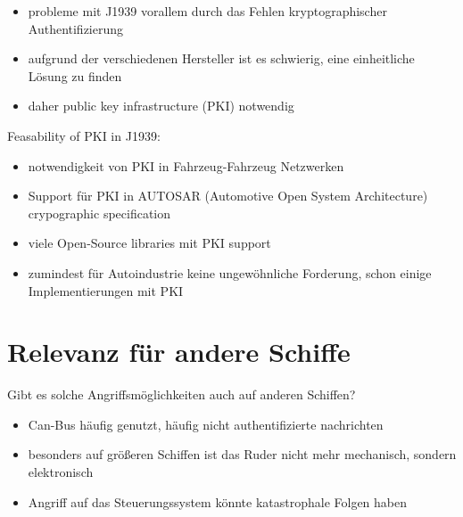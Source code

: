 \begin{itemize}
    \item probleme mit J1939 vorallem durch das Fehlen kryptographischer Authentifizierung
    \item aufgrund der verschiedenen Hersteller ist es schwierig, eine einheitliche Lösung zu finden
    \item daher public key infrastructure (PKI) notwendig
\end{itemize}
\cite{Murvay2018}
Feasability of PKI in J1939:
\begin{itemize}
    \item notwendigkeit von PKI in Fahrzeug-Fahrzeug Netzwerken
    \item Support für PKI in AUTOSAR (Automotive Open System Architecture) crypographic specification
    \item viele Open-Source libraries mit PKI support
    \item zumindest für Autoindustrie keine ungewöhnliche Forderung, schon einige Implementierungen mit PKI
\end{itemize}
\cite{Murvay2018}
\section{Relevanz für andere Schiffe}
Gibt es solche Angriffsmöglichkeiten auch auf anderen Schiffen?
\begin{itemize}
    \item Can-Bus häufig genutzt, häufig nicht authentifizierte nachrichten
    \item besonders auf größeren Schiffen ist das Ruder nicht mehr mechanisch, sondern elektronisch
    \item Angriff auf das Steuerungssystem könnte katastrophale Folgen haben
\end{itemize}